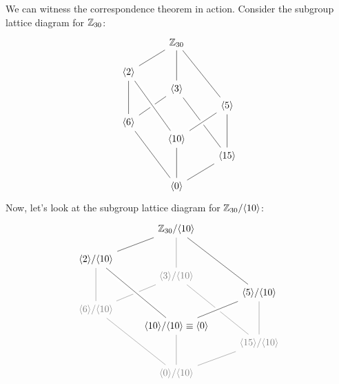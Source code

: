 \documentclass{ximera}
\begin{document}
\begin{example}
  We can witness the correspondence theorem in action. Consider the
  subgroup lattice diagram for $\mathbb Z_{30}$:
  \[
  \begin{tikzcd}[row sep=0in]
    & \Z_{30} \ar[ldd,-]  \ar[ddd,-] \ar[rdddd,-] &       \\
    &\phantom{MM} & \\
    \<2\>  \ar[ddd,-] &   &  \\
    & \<3\>\ar[ldd,-]\ar[rdddd,-] & \\
    &  &  \<5\> \ar[ddd,-]\\
    \<6\> \ar[rdddd,-]& & \\
    &\<10\> \ar[ddd,-]\ar[ruu,-,white,line width=2mm]\ar[ruu,-]\ar[luuuu,-,white,line width=2mm]\ar[luuuu,-] & \\
    & & \<15\>\ar[ldd,-]\\
    &\phantom{MM} & \\
    & \<0\> &
  \end{tikzcd}
  \]
  Now, let's look at the subgroup lattice diagram for
  $\mathbb Z_{30}/\langle10\rangle$:
  \[
  \begin{tikzcd}[row sep=0in]
    & \Z_{30}/\<10\>\ar[ldd,-]  \ar[white!50!black,ddd,-] \ar[rdddd,-] &       \\
    &\phantom{MM} & \\
    \<2\> /\<10\> \ar[white!50!black,ddd,-] &   &  \\
    & \color{white!50!black}\<3\>/\<10\>\ar[white!50!black,ldd,-]\ar[white!50!black,rdddd,-] & \\
    &  &  \<5\> /\<10\>\ar[white!50!black,ddd,-]\\
    \color{white!50!black}\<6\>/\<10\>\ar[white!50!black,rdddd,-]& & \\
    &\<10\>/\<10\> \equiv \<0\> \ar[white!50!black,ddd,-]\ar[ruu,-,white,line width=2mm]\ar[ruu,-]\ar[luuuu,-,white,line width=2mm]\ar[luuuu,-] & \\
    & & \color{white!50!black} \<15\>/\<10\>\ar[white!50!black,ldd,-]\\
    &\phantom{MM} & \\
    &  \color{white!50!black}\<0\>/\<10\> &
  \end{tikzcd}
  \]
\end{example}
\end{document}
